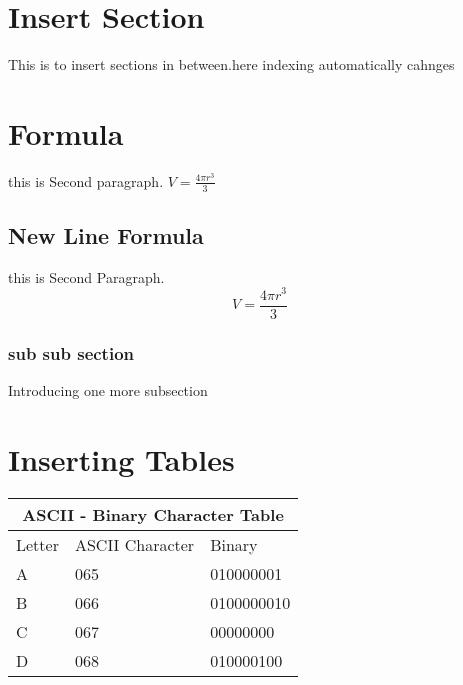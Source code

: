 \documentclass{article}
\begin{document}
\section{Insert Section}
This is to insert sections in between.here indexing automatically cahnges

\section{Formula}
this is Second paragraph.
$ V = \frac{4 \pi r^3}{3} $
\subsection{New Line Formula}
this is Second Paragraph.
$$ V = \frac{4 \pi r^3}{3} $$
\subsubsection{sub sub section}
Introducing one more subsection
\section{Inserting Tables}
\begin{tabular}{|p{3cm}|p{3cm}|p{3cm}|}
\hline
\multicolumn{3}{|c|}{ASCII - Binary Character Table}\\
\hline
\hline
Letter & ASCII Character & Binary\\
\hline
A&065&010000001\\
B&066&0100000010\\
C& 067& 00000000\\
D& 068& 010000100\\
\hline

\end{tabular}
\end{document}
